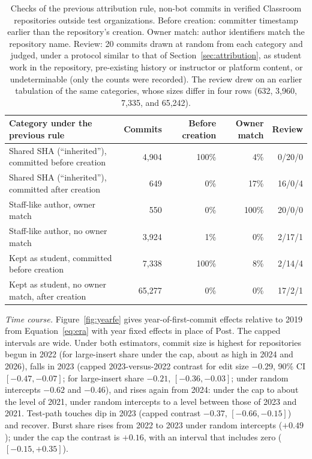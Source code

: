 \documentclass[acmsmall,screen,review,anonymous]{acmart}
\begin{document}
\begin{table}[h]
\caption{Checks of the previous attribution rule, non-bot commits in verified Classroom repositories outside test organizations. Before creation: committer timestamp earlier than the repository's creation. Owner match: author identifiers match the repository name. Review: 20 commits drawn at random from each category and judged, under a protocol similar to that of Section~\ref{sec:attribution}, as student work in the repository, pre-existing history or instructor or platform content, or undeterminable (only the counts were recorded). The review drew on an earlier tabulation of the same categories, whose sizes differ in four rows (632, 3,960, 7,335, and 65,242).}
\label{tab:activity}
\footnotesize
\setlength{\tabcolsep}{4pt}
\begin{tabular}{@{}p{5.6cm} r r r r@{}}
\toprule
Category under the previous rule & Commits & Before creation & Owner match & Review \\
\midrule
Shared SHA (``inherited''), committed before creation & 4,904 & 100\% & 4\% & 0/20/0 \\
Shared SHA (``inherited''), committed after creation & 649 & 0\% & 17\% & 16/0/4 \\
Staff-like author, owner match & 550 & 0\% & 100\% & 20/0/0 \\
Staff-like author, no owner match & 3,924 & 1\% & 0\% & 2/17/1 \\
Kept as student, committed before creation & 7,338 & 100\% & 8\% & 2/14/4 \\
Kept as student, no owner match, after creation & 65,277 & 0\% & 0\% & 17/2/1 \\
\bottomrule
\end{tabular}
\end{table}









\textit{Time course.} Figure~\ref{fig:yearfe} gives year-of-first-commit effects relative to 2019 from Equation~\ref{eq:era} with year fixed effects in place of $\mathrm{Post}$. The capped intervals are wide. Under both estimators, commit size is highest for repositories begun in 2022 (for large-insert share under the cap, about as high in 2024 and 2026), falls in 2023 (capped 2023-versus-2022 contrast for edit size $-0.29$, 90\% CI $[-0.47, -0.07]$; for large-insert share $-0.21$, $[-0.36, -0.03]$; under random intercepts $-0.62$ and $-0.46$), and rises again from 2024: under the cap to about the level of 2021, under random intercepts to a level between those of 2023 and 2021. Test-path touches dip in 2023 (capped contrast $-0.37$, $[-0.66, -0.15]$) and recover. Burst share rises from 2022 to 2023 under random intercepts ($+0.49$); under the cap the contrast is $+0.16$, with an interval that includes zero ($[-0.15, +0.35]$).
\end{document}
